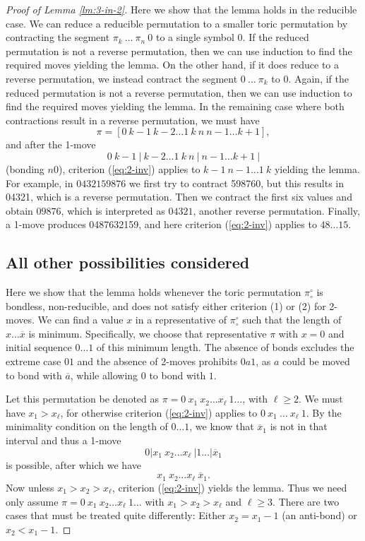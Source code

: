 \documentclass[11pt]{amsart} %
\newcommand{\Bpi}{{\pi}^\circ}
\newcommand{\Tpi}{\Bpi_\circ}
\newcommand{\xbar}{\overline{x}}
\newcommand{\abar}{\overline{a}}
\begin{document}
\begin{proof}[Proof of Lemma \ref{lm:3-in-2}]
Here we show that the lemma holds in the reducible case. 
We can reduce a reducible permutation to a smaller toric
permutation by contracting the segment $ \pi_k\ \dots\ \pi_n\ 0$
to a single symbol 0. If the reduced permutation is not a reverse
permutation, then we can use induction to find the required
moves yielding the lemma.
On the other hand, if it does reduce to a reverse permutation, we 
instead contract the
segment $ 0\ \dots\ \pi_k $ to $0$.
Again, if the reduced permutation is not a reverse permutation, then we
can use induction to find the required moves yielding the 
lemma.  In the remaining case where both contractions result in a
reverse permutation, we must have 
$$\pi=[0\ k\!-\!1\ k\!-\!2\ldots 1\ k\ n\ n\!-\!1\ldots k\!+\!1], $$ 
and after the 1-move 
$$0\ k\!-\!1\ |\ k\!-\!2\ldots 1\ k\ n\ |\ n\!-\!1\ldots k\!+\!1\ |$$
(bonding $n0$), criterion (\ref{eq:2-inv}) applies to 
$k\!-\!1\ n\!-\!1\ldots 1\ k$ yielding the lemma.
For example, in $0432159876$ we first try to
contract 598760, but this results in 04321, which is a reverse
permutation. Then we contract the first six values and obtain
$09876$, which is interpreted as $04321$, another reverse
permutation. Finally, a 1-move produces 0487632159, and here
 criterion (\ref{eq:2-inv}) applies to $48\ldots 15$.

\subsection{All other possibilities considered}
Here we show that the lemma holds whenever the toric permutation $\Tpi$
is bondless, non-reducible, and does not satisfy either
criterion (1) or (2) for 2-moves.
We can find a value  $x$ in a representative of $\Tpi$ such that
the length of $x\ldots \xbar$ is  minimum.  Specifically, we 
 choose that representative $\pi$ with $x=0$ and initial sequence  
$0\ldots 1$ of this minimum length. The
absence of bonds excludes the extreme case $01$ and the absence of
2-moves prohibits $0a1$, as $a$ could be moved to bond with $\abar$,
while allowing $0$ to bond with $1$.

Let this permutation be denoted as 
 $\pi= 0\ x_1\ x_2 \dots x_\ell\ 1\dots$, with $\ell \ge 2$.
We must have $x_1>x_\ell$, for otherwise criterion
(\ref{eq:2-inv}) applies to $0\ x_1\ \dots\ x_\ell\ 1$.
By the minimality condition on  the length of $0\dots
1$, we know that $\xbar_1$ is not in that interval and thus a
1-move $$0|x_1\ x_2\dots x_\ell\ |1\dots |\xbar_1$$ is possible,
after which we have $$x_1\ x_2\dots x_\ell\ \xbar_1.$$ Now unless
$x_1>x_2>x_\ell$, criterion (\ref{eq:2-inv}) yields the lemma. Thus we
need only assume $\pi= 0\ x_1\ x_2 \dots x_\ell\
1\dots$ with $x_1>x_2>x_\ell$ and $\ell \ge 3$. 
There are two cases that must be treated quite differently:
 Either $x_2=x_1\!-\!1$ (an anti-bond) or $x_2 < x_1 -1$.


\end{proof}
\end{document}
